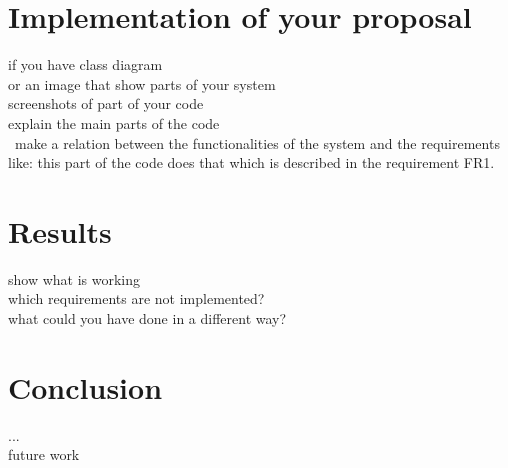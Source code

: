 \section{Implementation of your proposal}
\label{sec:4}
   if you have class diagram
\\ or an image that show parts of your system
\\ screenshots of part of your code
\\ explain the main parts of the code
\\ make a relation between the functionalities of the system and the requirements
\\ like: this part of the code does that which is described in the requirement FR1.

\section{Results}
\label{sec:5}
   show what is working
\\ which requirements are not implemented?
\\ what could you have done in a different way?

\section{Conclusion}
\label{sec:5}
...
\\ future work